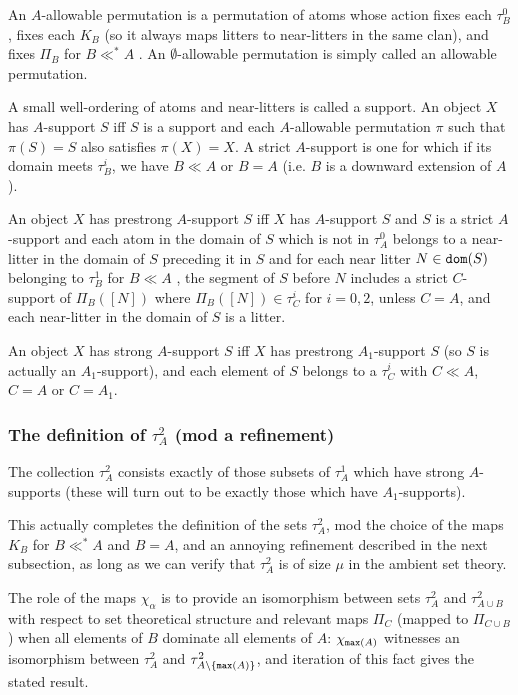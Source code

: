 \documentclass[12pt]{article}
\begin{document}
An $A$-allowable permutation is a permutation of atoms whose action fixes each $\tau^0_B$, fixes each $K_B$ (so it always maps litters to near-litters in the same clan), and fixes $\Pi_B$ for $B \ll^* A$
.  
An $\emptyset$-allowable permutation is simply called an allowable permutation.

A small well-ordering of atoms and near-litters is called a support.   An object $X$ has $A$-support $S$ iff $S$ is a support and each $A$-allowable permutation $\pi$ such that $\pi(S)=S$ also
satisfies $\pi(X)=X$.  A strict $A$-support is one for which if its domain meets $\tau^i_B$, we have $B \ll A$ or $B=A$ (i.e. $B$ is a downward extension of $A$).

An object $X$ has prestrong $A$-support $S$ iff $X$ has $A$-support $S$ and $S$ is a strict $A$-support and each atom in the domain of $S$ which is not in $\tau^0_A$ belongs to a near-litter in the domain of $S$ preceding it in $S$ and for each near litter $N \in{\tt dom}(S)$ belonging to $\tau^1_B$ for $B \ll A$%
, the segment of $S$
before $N$ includes  a strict $C$-support of $\Pi_B([N])$ where  $\Pi_B([N])\in \tau^i_C$ for $i=0,2$, unless $C=A$, and each near-litter in the domain of $S$ is a litter.

An object $X$ has strong $A$-support $S$ iff $X$ has prestrong $A_1$-support $S$ (so $S$ is actually an $A_1$-support), and each element of $S$ belongs to 
a $\tau^i_C$ with $C \ll A$, $C=A$ or $C = A_1$.

\newpage

\subsubsection{The definition of $\tau^2_A$ (mod a refinement)}

The collection $\tau^2_A$ consists exactly of those subsets of $\tau^1_A$ which have strong $A$-supports (these will turn out to be exactly those which have $A_1$-supports).

This actually completes the definition of the sets $\tau^2_A$, mod the choice of the maps $K_B$ for $B \ll^* A$ and $B=A$, and an annoying refinement described in the next subsection, as long as we can verify that $\tau^2_A$ is of size $\mu$
in the ambient set theory.

The role of the maps $\chi_{\alpha}$ is to provide an isomorphism between sets $\tau^2_A$ and $\tau^2_{A \cup B}$ with respect to set theoretical structure and relevant maps $\Pi_C$ (mapped to $\Pi_{C \cup B}$) when all elements of $B$ dominate all elements of $A$:
$\chi_{{\tt max}(A)}$ witnesses an isomorphism between $\tau^2_A$ and $\tau^2_{A \setminus \{{\tt max}(A)\}}$, and iteration of this fact gives the stated result.
\end{document}
